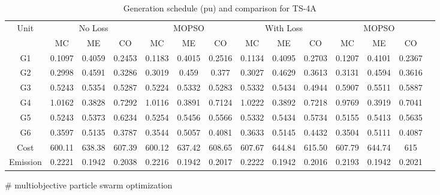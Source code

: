 \begin{table*}[!htbp]
\centering
\renewcommand{\arraystretch}{1.3}
\caption{Generation schedule (pu) and comparison for TS-4A}
\label{table_ts4A}
\begin{threeparttable}[c]
\scalebox{0.7} {
\begin{tabular}{|c|c|c|c|c|c|c|c|c|c|c|c|c|c|}
\hline
\multirow{2}{*}{Unit} & \multicolumn{3}{c|}{No Loss} & \multicolumn{3}{c|}{MOPSO \tnote{\#} \cite{09EPSRAbido}} & \multicolumn{3}{c|}{With Loss} & \multicolumn{3}{c|}{MOPSO} \\\cline{2-13}
 & MC & ME & CO & MC & ME & CO & MC & ME & CO & MC & ME & CO\\
\hline
G1	&	0.1097	&	0.4059	&	0.2453 &	0.1183	&	0.4015	&	0.2516	&	0.1134	&	0.4095	&	0.2703 &	0.1207	&	0.4101	&	0.2367\\
\hline
G2	&	0.2998	&	0.4591	&	0.3286 &	0.3019	&	0.459	&	0.377	&	0.3027	&	0.4629	&	0.3613 &	0.3131	&	0.4594	&	0.3616\\
\hline
G3	&	0.5243	&	0.5354	&	0.5287 &	0.5224	&	0.5332	&	0.5283	&	0.5332	&	0.5434	&	0.4944 &	0.5907	&	0.5511	&	0.5887\\
\hline
G4	&	1.0162	&	0.3828	&	0.7292 &	1.0116	&	0.3891	&	0.7124	&	1.0222	&	0.3892	&	0.7218 &	0.9769	&	0.3919	&	0.7041\\
\hline
G5	&	0.5243	&	0.5373	&	0.6234 &	0.5254	&	0.5456	&	0.5566	&	0.5332	&	0.5434	&	0.5734 &	0.5155	&	0.5413	&	0.5635\\
\hline
G6	&	0.3597	&	0.5135	&	0.3787 &	0.3544	&	0.5057	&	0.4081	&	0.3633	&	0.5145	&	0.4432 &	0.3504	&	0.5111	&	0.4087\\
\hline
Cost &	600.11	&	638.38	&	607.39 &	600.12	&	637.42	&	608.65	&	607.67	&	644.84	&	615.50 &	607.79	&	644.74	&	615\\
\hline
Emission &	0.2221	&	0.1942	&	0.2038 &	0.2216	&	0.1942	&	0.2017	&	0.2222	&	0.1942	&	0.2016 &	0.2193	&	0.1942	&	0.2021\\
\hline
\end{tabular}
}
\begin{tablenotes}
\item[\#] multiobjective particle swarm optimization
\end{tablenotes}
\end{threeparttable}
\end{table*}

